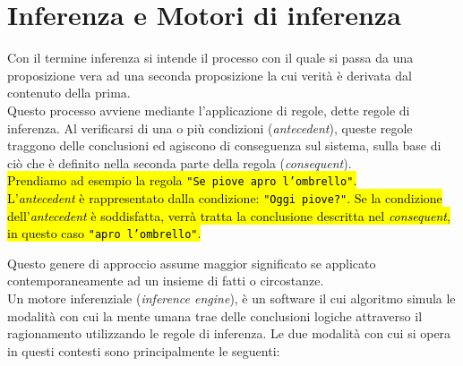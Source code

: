 \section{Inferenza e Motori di inferenza}

 \label{App:AppendiceInference}
 Con  il termine inferenza si intende il processo con il quale si passa da una proposizione vera ad una seconda proposizione la cui verità è derivata dal contenuto della prima. \\
 Questo processo avviene mediante l'applicazione di regole, dette regole di inferenza. Al verificarsi di una o più condizioni (\textit{antecedent}), queste regole traggono delle conclusioni ed agiscono di conseguenza sul sistema, sulla base di ciò che è definito nella seconda parte della regola (\textit{consequent}).\\
 \hl{Prendiamo ad esempio la regola \texttt{"Se piove apro l'ombrello"}. \\ L'\textit{antecedent} è rappresentato dalla condizione: \texttt{"Oggi piove?"}. Se la condizione dell'\textit{antecedent} è soddisfatta, verrà tratta la conclusione descritta nel \textit{consequent}, in questo caso \texttt{"apro l'ombrello"}. }
 
 Questo genere di approccio assume maggior significato se applicato contemporaneamente ad un insieme di fatti o circostanze. \\
 Un motore inferenziale (\textit{inference engine}), è un software il cui algoritmo simula le modalità con cui la mente umana trae delle conclusioni logiche attraverso il ragionamento utilizzando le regole di inferenza.
 Le due modalità con cui si opera in questi contesti sono principalmente le seguenti:

